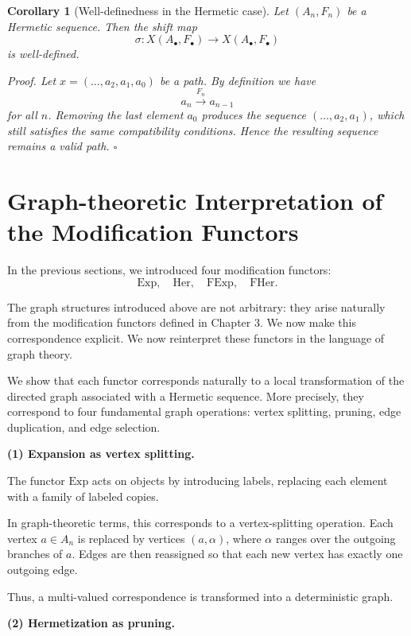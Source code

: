 \documentclass[11pt]{book}
\theoremstyle{definition}
\theoremstyle{plain}
\newtheorem{corollary}[theorem]{Corollary}
\theoremstyle{remark}
\begin{document}
\begin{corollary}[Well-definedness in the Hermetic case]
Let $(A_n,F_n)$ be a Hermetic sequence.
Then the shift map
\[
\sigma : X(A_\bullet,F_\bullet) \to X(A_\bullet,F_\bullet)
\]
is well-defined.

\emph{Proof.}
Let $x=(\ldots,a_2,a_1,a_0)$ be a path.
By definition we have
\[
a_n \xrightarrow{F_n} a_{n-1}
\]
for all $n$.
Removing the last element $a_0$ produces the sequence
$(\ldots,a_2,a_1)$, which still satisfies the same compatibility
conditions.
Hence the resulting sequence remains a valid path.
\hfill $\square$
\end{corollary}

\section{Graph-theoretic Interpretation of the Modification Functors}

In the previous sections, we introduced four modification functors:
\[
\mathrm{Exp}, \quad \mathrm{Her}, \quad \mathrm{FExp}, \quad \mathrm{FHer}.
\]

The graph structures introduced above are not arbitrary:
they arise naturally from the modification functors defined in Chapter 3.
We now make this correspondence explicit. We now reinterpret these functors in the language of graph theory.

We show that each functor corresponds naturally to a local transformation
of the directed graph associated with a Hermetic sequence.
More precisely, they correspond to four fundamental graph operations:
vertex splitting, pruning, edge duplication, and edge selection.

\medskip

\textbf{(1) Expansion as vertex splitting.}

The functor $\mathrm{Exp}$ acts on objects by introducing labels,
replacing each element with a family of labeled copies.

In graph-theoretic terms, this corresponds to a vertex-splitting operation.
Each vertex $a \in A_n$ is replaced by vertices $(a,\alpha)$,
where $\alpha$ ranges over the outgoing branches of $a$.
Edges are then reassigned so that each new vertex has exactly one outgoing edge.

Thus, a multi-valued correspondence is transformed into a deterministic graph.

\medskip

\textbf{(2) Hermetization as pruning.}
\end{document}
